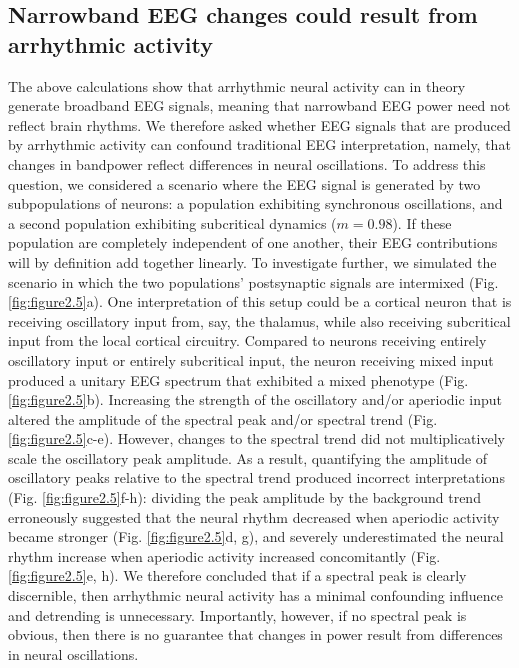 \subsection{Narrowband EEG changes could result from arrhythmic activity}
The above calculations show that arrhythmic neural activity can in theory generate broadband EEG signals, meaning that narrowband EEG power need not reflect brain rhythms. We therefore asked whether EEG signals that are produced by arrhythmic activity can confound traditional EEG interpretation, namely, that changes in bandpower reflect differences in neural oscillations. To address this question, we considered a scenario where the EEG signal is generated by two subpopulations of neurons: a population exhibiting synchronous oscillations, and a second population exhibiting subcritical dynamics ($m=0.98$). If these population are completely independent of one another, their EEG contributions will by definition add together linearly. To investigate further, we simulated the scenario in which the two populations’ postsynaptic signals are intermixed (Fig. \ref{fig:figure2.5}a). One interpretation of this setup could be a cortical neuron that is receiving oscillatory input from, say, the thalamus, while also receiving subcritical input from the local cortical circuitry. Compared to neurons receiving entirely oscillatory input or entirely subcritical input, the neuron receiving mixed input produced a unitary EEG spectrum that exhibited a mixed phenotype (Fig. \ref{fig:figure2.5}b). Increasing the strength of the oscillatory and/or aperiodic input altered the amplitude of the spectral peak and/or spectral trend (Fig. \ref{fig:figure2.5}c-e). However, changes to the spectral trend did not multiplicatively scale the oscillatory peak amplitude. As a result, quantifying the amplitude of oscillatory peaks relative to the spectral trend produced incorrect interpretations (Fig. \ref{fig:figure2.5}f-h): dividing the peak amplitude by the background trend erroneously suggested that the neural rhythm decreased when aperiodic activity became stronger (Fig. \ref{fig:figure2.5}d, g), and severely underestimated the neural rhythm increase when aperiodic activity increased concomitantly (Fig. \ref{fig:figure2.5}e, h). We therefore concluded that if a spectral peak is clearly discernible, then arrhythmic neural activity has a minimal confounding influence and detrending is unnecessary. Importantly, however, if no spectral peak is obvious, then there is no guarantee that changes in power result from differences in neural oscillations.

